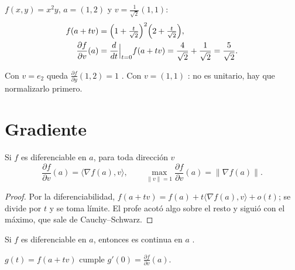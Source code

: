\documentclass{classmer}
\begin{document}

\begin{ejemplo}
$f(x,y)=x^2y$, $a=(1,2)$ y $v=\tfrac{1}{\sqrt2}(1,1)$:
\begin{align*}
  f(a+tv) &= \Bigl(1+\tfrac{t}{\sqrt2}\Bigr)^2\Bigl(2+\tfrac{t}{\sqrt2}\Bigr),\\
  \frac{\partial f}{\partial v}(a) &= \frac{d}{dt}\Big|_{t=0} f(a+tv)
     = \frac{4}{\sqrt2}+\frac{1}{\sqrt2} = \frac{5}{\sqrt2}.
\end{align*}
\end{ejemplo}

\begin{ejemplo}
Con $v=e_2$ queda $\frac{\partial f}{\partial y}(1,2)=1$ \ok. Con $v=(1,1)$
\cross: no es unitario, hay que normalizarlo primero.
\end{ejemplo}

\section{Gradiente }

\begin{teorema}
Si $f$ es diferenciable en $a$, para toda dirección $v$
\[
  \frac{\partial f}{\partial v}(a)=\langle\nabla f(a),v\rangle,
  \qquad
  \max_{\|v\|=1}\frac{\partial f}{\partial v}(a)=\|\nabla f(a)\|.
\]
\end{teorema}

\begin{proof}
Por la diferenciabilidad, $f(a+tv)=f(a)+t\langle\nabla f(a),v\rangle+o(t)$; se
divide por $t$ y se toma límite. El profe acotó algo sobre el resto
 y siguió con el máximo, que sale de Cauchy--Schwarz.
\end{proof}

\begin{teorema}
Si $f$ es diferenciable en $a$, entonces es continua en $a$ .
\end{teorema}

\begin{lema}
$g(t)=f(a+tv)$ cumple $g'(0)=\frac{\partial f}{\partial v}(a)$.
\end{lema}
\end{document}
